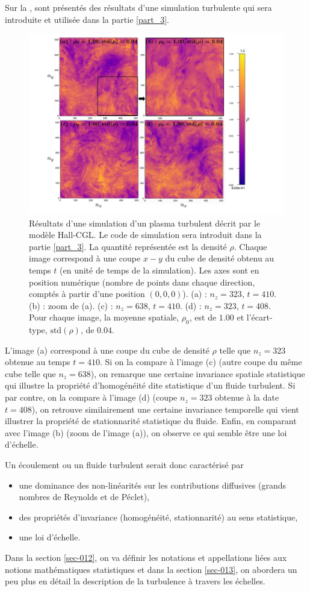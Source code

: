  Sur la , sont présentés des résultats d'une simulation turbulente  qui sera introduite et utilisée dans la partie \ref{part_3}.
 \begin{figure}[!ht]
  \centering
 \includegraphics[width=0.8\linewidth,trim=2cm 0cm 4cm 0cm, clip=true]{./Mainmatter/Part_0/images/simu_panel_rho}
 \cprotect\caption{Résultats d'une simulation  d'un plasma turbulent décrit par le modèle Hall-CGL. Le code de simulation sera introduit dans la partie \ref{part_3}. La quantité représentée est la densité $\rho$. Chaque image correspond à une coupe $x-y$ du cube de densité obtenu au temps $t$ (en unité de temps de la simulation). Les axes sont en position numérique (nombre de points dans chaque direction, comptés à partir d'une position $(0,0,0)$). (a) : $n_z=323$, $t=410$. (b) : zoom de (a). (c) : $n_z=638$, $t=410$. (d) : $n_z=323$, $t=408$. Pour chaque image, la moyenne spatiale, $\rho_0$, est de $\num{1.00}$ et l'écart-type, $\text{std}(\rho)$, de $\num{0.04}$.}
 \label{fig:comp_turbul}
 \end{figure}
 L'image (a) correspond à une coupe du cube de densité $\rho$ telle que $n_z=323$ obtenue au temps $t=410$. Si on la compare à l'image (c) (autre coupe du même cube telle que $n_z=638$), on remarque une certaine invariance spatiale statistique qui illustre la propriété d'homogénéité dite statistique d'un fluide turbulent. Si par contre, on la compare à l'image (d) (coupe $n_z=323$ obtenue à la date $t=408$), on retrouve similairement une certaine invariance temporelle qui vient illustrer la propriété de stationnarité statistique du fluide. Enfin, en comparant avec l'image (b) (zoom de l'image (a)), on observe ce qui semble être une loi d'échelle.
 
 Un écoulement ou un fluide turbulent serait donc caractérisé par
 \begin{itemize}
 \item une dominance des non-linéarités sur les contributions diffusives (grands nombres de Reynolds et de Péclet),
 \item des propriétés d'invariance (homogénéité, stationnarité) au sens statistique,
 \item une loi d'échelle.
 \end{itemize}
 Dans la section \ref{sec-012}, on va définir les notations et appellations liées aux notions mathématiques statistiques et dans la section \ref{sec-013}, on abordera un peu plus en détail la description de la turbulence à travers les échelles.
 
